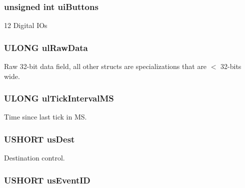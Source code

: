 \subsubsection[{uiButtons}]{\setlength{\rightskip}{0pt plus 5cm}unsigned int {\bf uiButtons}}\label{struct_f_o_o_e_y___e_v_e_n_t___s_t_r_u_c_t_a7c10df8f6a492d45ee3815d8440d4d1d}


12 Digital IOs 
\subsubsection[{ulRawData}]{\setlength{\rightskip}{0pt plus 5cm}ULONG {\bf ulRawData}}\label{struct_f_o_o_e_y___e_v_e_n_t___s_t_r_u_c_t_afce82e8dc1207662ec90cfa5ed358dd8}


Raw 32-\/bit data field, all other structs are specializations that are $<$ 32-\/bits wide. 
\subsubsection[{ulTickIntervalMS}]{\setlength{\rightskip}{0pt plus 5cm}ULONG {\bf ulTickIntervalMS}}\label{struct_f_o_o_e_y___e_v_e_n_t___s_t_r_u_c_t_a94225d3b8b2fcd740e88b301417a84a1}


Time since last tick in MS. 
\subsubsection[{usDest}]{\setlength{\rightskip}{0pt plus 5cm}USHORT {\bf usDest}}\label{struct_f_o_o_e_y___e_v_e_n_t___s_t_r_u_c_t_a98e4877fe072ba829f82b8025a092467}


Destination control. 
\subsubsection[{usEventID}]{\setlength{\rightskip}{0pt plus 5cm}USHORT {\bf usEventID}}\label{struct_f_o_o_e_y___e_v_e_n_t___s_t_r_u_c_t_a31f5f42219a8b4c351cf16734572e0a4}


